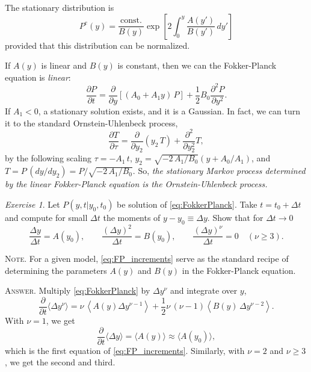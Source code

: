 \documentclass{book}
\numberwithin{equation}{section}
\theoremstyle{plain}
\theoremstyle{definition}
\theoremstyle{remark}
\theoremstyle{BoldStyle}
\newtheorem{exercise}{Exercise}
\numberwithin{exercise}{section}
\newcommand{\note}[1]{{\color{DarkGreen}\footnotesize \textsc{Note.} #1}}
\newcommand{\answer}[1]{{\color{DarkBlue}\footnotesize \textsc{Answer.} #1}}
\begin{document}
The stationary distribution is
%
\begin{equation}
  P^e(y)
  =
  \frac{ \mathrm{const.} } { B(y) }
  \exp\left[
    2 \int_0^y
      \frac{ A(y') } { B(y') } \, dy'
  \right]
  \label{eq:FP_stationary}
\end{equation}
%
provided that this distribution can be normalized.


If $A(y)$ is linear and $B(y)$ is constant,
then we can the Fokker-Planck equation is \emph{linear}:
%
\begin{equation}
  \frac{ \partial P } { \partial t }
  =
  \frac{ \partial } { \partial y }
  \left[
    (A_0 + A_1 y) \, P
  \right]
  +
  \frac{1}{2} B_0
  \frac{ \partial^2 P } { \partial y^2 }.
  \label{eq:FP_linear}
\end{equation}
%
If $A_1 < 0$,
a stationary solution exists,
and it is a Gaussian.
%
In fact,
we can turn it to the standard Ornstein-Uhlenbeck process,
%
\begin{equation}
  \frac{ \partial T }{ \partial \tau }
  =
  \frac{ \partial } { \partial y_2 }
  ( y_2 \, T )
  +
  \frac{ \partial^2 } { \partial y_2^2 } T,
  \tag{IV.3.20}
\end{equation}
%
by the following scaling
$\tau = -A_1 \, t$,
$y_2 = \sqrt{-2 \, A_1/B_0} \left(y + A_0/A_1\right)$,
and
$T = P \, (dy/dy_2) = P / \sqrt{-2 \, A_1/B_0}$.
%
So,
\emph{
  the stationary Markov process determined by
  the linear Fokker-Planck equation
  is the Ornstein-Uhlenbeck process.
}

\begin{exercise}
  Let $P(y, t|y_0, t_0)$ be solution of \eqref{eq:FokkerPlanck}.
  Take $t = t_0 + \Delta t$ and compute for small $\Delta t$
  the moments of $y - y_0 \equiv \Delta y$.
  Show that for $\Delta t \to 0$
  \begin{equation}
    \frac{ \Delta y } { \Delta t }
    =
    A( y_0 ),
    \qquad
    \frac{ (\Delta y)^2 } { \Delta t }
    =
    B( y_0 ),
    \qquad
    \frac{ (\Delta y)^\nu } { \Delta t }
    =
    0 \quad (\nu \ge 3).
    \label{eq:FP_increments}
  \end{equation}

  \note{For a given model,
    \eqref{eq:FP_increments}
    serve as the standard recipe of determining
    the parameters $A(y)$ and $B(y)$
    in the Fokker-Planck equation.
  }

  \answer{
    Multiply \eqref{eq:FokkerPlanck}
    by $\Delta y^\nu$ and integrate over $y$,
    $$
    \frac{ \partial } { \partial t } \langle \Delta y^\nu \rangle
    =
    \nu \, \left\langle A(y) \Delta y^{\nu - 1} \right\rangle
    +
    \frac{1}{2} \nu \, (\nu - 1)
    \left\langle B(y) \, \Delta y^{\nu - 2} \right\rangle.
    $$
    With $\nu = 1$, we get
    $$
    \frac{ \partial } { \partial t } \langle \Delta y \rangle
    =
    \langle A(y) \rangle
    \approx
    \langle A(y_0) \rangle,
    $$
    which is the first equation of \eqref{eq:FP_increments}.
    Similarly, with $\nu = 2$ and $\nu \ge 3$,
    we get the second and third.
  }
\end{exercise}
\end{document}
